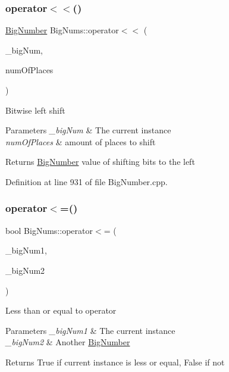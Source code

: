 \subsubsection{\texorpdfstring{operator$<$$<$()}{operator<<()}\hspace{0.1cm}{\footnotesize\ttfamily [2/2]}}
{\footnotesize\ttfamily \mbox{\hyperlink{class_big_nums_1_1_big_number}{Big\+Number}} Big\+Nums\+::operator$<$$<$ (\begin{DoxyParamCaption}\item[{const \mbox{\hyperlink{class_big_nums_1_1_big_number}{Big\+Number}} \&}]{\+\_\+big\+Num,  }\item[{int}]{num\+Of\+Places }\end{DoxyParamCaption})}

Bitwise left shift 
\begin{DoxyParams}{Parameters}
{\em \+\_\+big\+Num} & The current instance \\
\hline
{\em num\+Of\+Places} & amount of places to shift \\
\hline
\end{DoxyParams}
\begin{DoxyReturn}{Returns}
\mbox{\hyperlink{class_big_nums_1_1_big_number}{Big\+Number}} value of shifting bits to the left 
\end{DoxyReturn}


Definition at line 931 of file Big\+Number.\+cpp.

\mbox{\label{namespace_big_nums_a60e44068f20ee7b59d24f7147282eb2c}} 
\subsubsection{\texorpdfstring{operator$<$=()}{operator<=()}}
{\footnotesize\ttfamily bool Big\+Nums\+::operator$<$= (\begin{DoxyParamCaption}\item[{const \mbox{\hyperlink{class_big_nums_1_1_big_number}{Big\+Number}} \&}]{\+\_\+big\+Num1,  }\item[{const \mbox{\hyperlink{class_big_nums_1_1_big_number}{Big\+Number}} \&}]{\+\_\+big\+Num2 }\end{DoxyParamCaption})}

Less than or equal to operator 
\begin{DoxyParams}{Parameters}
{\em \+\_\+big\+Num1} & The current instance \\
\hline
{\em \+\_\+big\+Num2} & Another \mbox{\hyperlink{class_big_nums_1_1_big_number}{Big\+Number}} \\
\hline
\end{DoxyParams}
\begin{DoxyReturn}{Returns}
True if current instance is less or equal, False if not 
\end{DoxyReturn}


